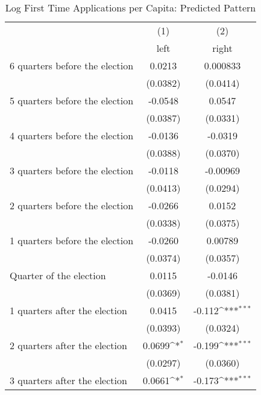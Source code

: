 \begin{table}[htbp]\centering
\def\sym#1{\ifmmode^{#1}\else\(^{#1}\)\fi}
\caption{Log First Time Applications per Capita: Predicted Pattern}
\begin{tabular}{l*{2}{c}}
\hline\hline
                    &\multicolumn{1}{c}{(1)}&\multicolumn{1}{c}{(2)}\\
                    &\multicolumn{1}{c}{left}&\multicolumn{1}{c}{right}\\
\hline
 6 quarters before the election&      0.0213         &    0.000833         \\
                    &    (0.0382)         &    (0.0414)         \\
[1em]
 5 quarters before the election&     -0.0548         &      0.0547         \\
                    &    (0.0387)         &    (0.0331)         \\
[1em]
 4 quarters before the election&     -0.0136         &     -0.0319         \\
                    &    (0.0388)         &    (0.0370)         \\
[1em]
 3 quarters before the election&     -0.0118         &    -0.00969         \\
                    &    (0.0413)         &    (0.0294)         \\
[1em]
 2 quarters before the election&     -0.0266         &      0.0152         \\
                    &    (0.0338)         &    (0.0375)         \\
[1em]
 1 quarters before the election&     -0.0260         &     0.00789         \\
                    &    (0.0374)         &    (0.0357)         \\
[1em]
Quarter of the election&      0.0115         &     -0.0146         \\
                    &    (0.0369)         &    (0.0381)         \\
[1em]
 1 quarters after the election&      0.0415         &      -0.112\sym{***}\\
                    &    (0.0393)         &    (0.0324)         \\
[1em]
 2 quarters after the election&      0.0699\sym{*}  &      -0.199\sym{***}\\
                    &    (0.0297)         &    (0.0360)         \\
[1em]
 3 quarters after the election&      0.0661\sym{*}  &      -0.173\sym{***}\\

\end{tabular}
\end{table}
